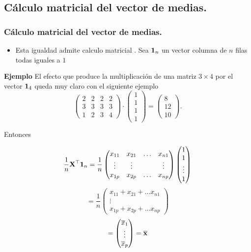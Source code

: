 \subsection{Cálculo matricial del vector de medias.}
\begin{frame}
\frametitle[Cál. mat. ect. medias]{Cálculo matricial del vector de medias.}
\begin{itemize}
\item Esta igualdad admite calculo matricial . Sea $\mathbf{1}_n$ un vector columna de $n$ filas todas iguales a $1$
\end{itemize}
\textbf{Ejemplo}
El efecto que produce la multiplicación de una matriz $3\times 4 $ por el vector $\mathbf{1}_4$ queda muy claro con el siguiente ejemplo
$$\begin{pmatrix}
2 & 2 & 2 & 2\\
3 & 3 & 3 & 3 \\
1 & 2 & 3 & 4   
\end{pmatrix}\cdot \begin{pmatrix} 1 \\ 1 \\ 1 \\ 1   \end{pmatrix}=
\begin{pmatrix} 8 \\ 12 \\ 10   \end{pmatrix}.$$


\end{frame}

\begin{frame}
Entonces

$$\frac{1}{n} \mathbf{X}^\top \mathbf{1}_n= \frac{1}{n}
\begin{pmatrix} x_{11} & x_{2 1}&\ldots & x_{n 1}\\
\vdots& \vdots &  & \vdots\\
x_{1 p} & x_{2 p}&\ldots & x_{n p}    \end{pmatrix} 
\begin{pmatrix} 1 \\ 1 \\ \vdots \\ 1   \end{pmatrix}$$
$$
=\frac{1}{n}
\begin{pmatrix} 
x_{11} + x_{2 1}+\ldots x_{n 1}\\
 \vdots \\
 x_{1 p} + x_{2 p}+\ldots x_{n p}    \end{pmatrix}$$
 $$=\begin{pmatrix} \overline{x}_{1}\\
 \vdots\\ \overline{x}_{p}    
\end{pmatrix}=
\overline{\mathbf{x}}$$
 
\end{frame}

